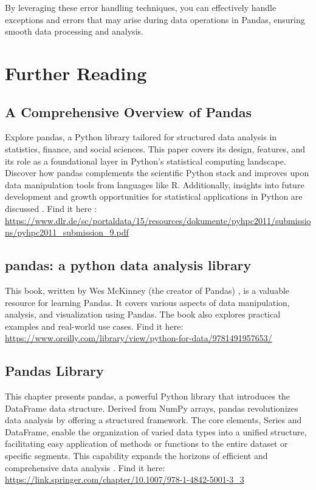 	By leveraging these error handling techniques, you can effectively handle exceptions and errors that may arise during data operations in Pandas, ensuring smooth data processing and analysis.


\section{Further Reading}

	\subsection{A Comprehensive Overview of Pandas}

	Explore pandas, a Python library tailored for structured data analysis in statistics, finance, and social sciences. This paper covers its design, features, and its role as a foundational layer in Python's statistical computing landscape. Discover how pandas complements the scientific Python stack and improves upon data manipulation tools from languages like R. Additionally, insights into future development and growth opportunities for statistical applications in Python are discussed \cite{McKinney:2012}. Find it here : \url{https://www.dlr.de/sc/portaldata/15/resources/dokumente/pyhpc2011/submissions/pyhpc2011_submission_9.pdf}

	\subsection{pandas: a python data analysis library}
	
	This book, written by Wes McKinney (the creator of Pandas) \cite{McKinney:2012}, is a valuable resource for learning Pandas. It covers various aspects of data manipulation, analysis, and visualization using Pandas. The book also explores practical examples and real-world use cases. 
	Find it here: \ul{https://www.oreilly.com/library/view/python-for-data/9781491957653/}

	\subsection{Pandas Library}
	
	This chapter presents pandas, a powerful Python library that introduces the DataFrame data structure. Derived from NumPy arrays, pandas revolutionizes data analysis by offering a structured framework. The core elements, Series and DataFrame, enable the organization of varied data types into a unified structure, facilitating easy application of methods or functions to the entire dataset or specific segments. This capability expands the horizons of efficient and comprehensive data analysis \cite{Zheng:2018}. 
	Find it here: \url{https://link.springer.com/chapter/10.1007/978-1-4842-5001-3_3}

